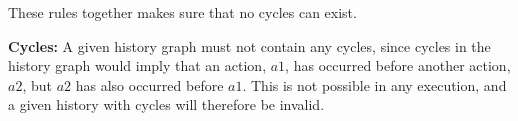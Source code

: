 	\newpar These rules together makes sure that no cycles can exist.
	
	\textbf{Cycles:} A given history graph must not contain any cycles, since cycles in the history graph would imply that an action, $a1$, has occurred before another action, $a2$, but $a2$ has also occurred before $a1$. This is not possible in any execution, and a given history with cycles will therefore be invalid.
	
	
	
	
	

